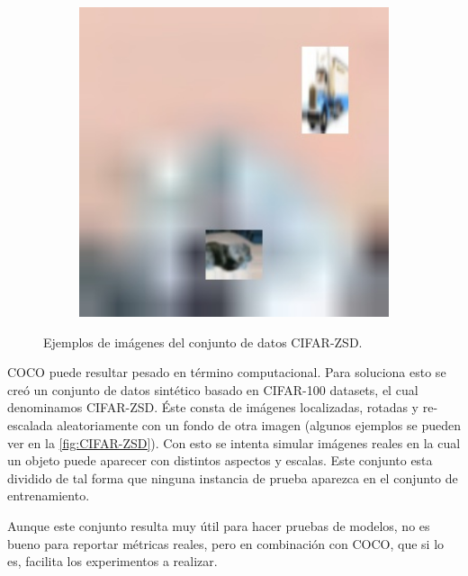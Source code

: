 \begin{figure}[]
\begin{center}
\begin{subfigure}{.3\textwidth}
			\label{fig:ex2}
		\end{subfigure}
		\begin{subfigure}{.3\textwidth}
			\includegraphics[width=1\textwidth]{img/cifar-zsd-test283.jpg}
			\label{fig:ex3}
		\end{subfigure}
		\caption{Ejemplos de imágenes del conjunto de datos CIFAR-ZSD.}
		\label{fig:CIFAR-ZSD}
	\end{center}
\end{figure}

COCO puede resultar pesado en término computacional. Para soluciona esto se creó un conjunto de datos sintético basado en CIFAR-100 datasets, el cual denominamos CIFAR-ZSD. Éste consta de imágenes localizadas, rotadas y re-escalada aleatoriamente con un fondo de otra imagen (algunos ejemplos se pueden ver en la \autoref{fig:CIFAR-ZSD}). Con esto se intenta simular imágenes reales en la cual un objeto puede aparecer con distintos aspectos y escalas. Este conjunto esta dividido de tal forma que ninguna instancia de prueba  aparezca en el conjunto de entrenamiento.

Aunque este conjunto resulta muy útil para hacer pruebas de modelos, no es bueno para reportar métricas reales, pero en combinación con COCO, que si lo es, facilita los experimentos a realizar.


